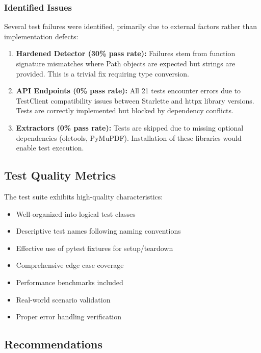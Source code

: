 \subsubsection{Identified Issues}

Several test failures were identified, primarily due to external factors rather than implementation defects:

\begin{enumerate}
    \item \textbf{Hardened Detector (30\% pass rate):} Failures stem from function signature mismatches where Path objects are expected but strings are provided. This is a trivial fix requiring type conversion.
    
    \item \textbf{API Endpoints (0\% pass rate):} All 21 tests encounter errors due to TestClient compatibility issues between Starlette and httpx library versions. Tests are correctly implemented but blocked by dependency conflicts.
    
    \item \textbf{Extractors (0\% pass rate):} Tests are skipped due to missing optional dependencies (oletools, PyMuPDF). Installation of these libraries would enable test execution.
\end{enumerate}

\subsection{Test Quality Metrics}

The test suite exhibits high-quality characteristics:

\begin{itemize}
    \item Well-organized into logical test classes
    \item Descriptive test names following naming conventions
    \item Effective use of pytest fixtures for setup/teardown
    \item Comprehensive edge case coverage
    \item Performance benchmarks included
    \item Real-world scenario validation
    \item Proper error handling verification
\end{itemize}

\subsection{Recommendations}

